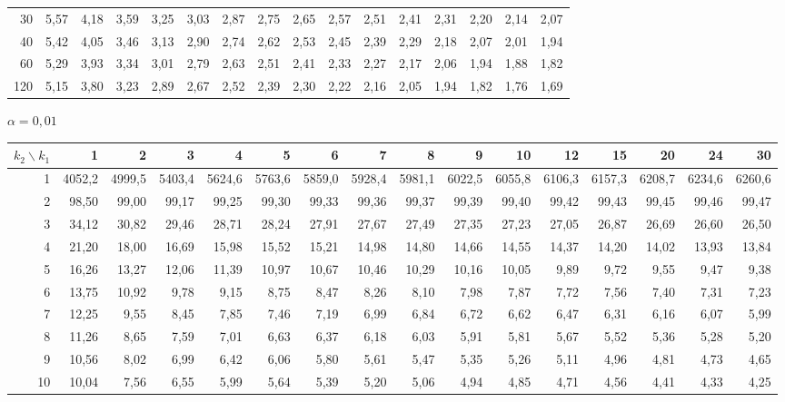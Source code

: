 \documentclass[a4paper,10pt]{extarticle}
\begin{document}
\begin{center}
\begin{tabular}{r|rrrrrrrrrrrrrrr}
30 & 5,57 & 4,18 & 3,59 & 3,25 & 3,03 & 2,87 & 2,75 & 2,65 & 2,57 & 2,51 & 2,41 & 2,31 & 2,20 & 2,14 & 2,07\\
40 & 5,42 & 4,05 & 3,46 & 3,13 & 2,90 & 2,74 & 2,62 & 2,53 & 2,45 & 2,39 & 2,29 & 2,18 & 2,07 & 2,01 & 1,94\\
60 & 5,29 & 3,93 & 3,34 & 3,01 & 2,79 & 2,63 & 2,51 & 2,41 & 2,33 & 2,27 & 2,17 & 2,06 & 1,94 & 1,88 & 1,82\\
120 & 5,15 & 3,80 & 3,23 & 2,89 & 2,67 & 2,52 & 2,39 & 2,30 & 2,22 & 2,16 & 2,05 & 1,94 & 1,82 & 1,76 & 1,69\\
\end{tabular}
\end{center}
\newpage
\scriptsize\renewcommand{\arraystretch}{0.86}\setlength{\tabcolsep}{2.6pt}
\begin{center}
\textbf{$\alpha=0{,}01$}\\[1pt]
\begin{tabular}{r|rrrrrrrrrrrrrrr}
$k_2\backslash k_1$ & 1 & 2 & 3 & 4 & 5 & 6 & 7 & 8 & 9 & 10 & 12 & 15 & 20 & 24 & 30\\\hline
1 & 4052,2 & 4999,5 & 5403,4 & 5624,6 & 5763,6 & 5859,0 & 5928,4 & 5981,1 & 6022,5 & 6055,8 & 6106,3 & 6157,3 & 6208,7 & 6234,6 & 6260,6\\
2 & 98,50 & 99,00 & 99,17 & 99,25 & 99,30 & 99,33 & 99,36 & 99,37 & 99,39 & 99,40 & 99,42 & 99,43 & 99,45 & 99,46 & 99,47\\
3 & 34,12 & 30,82 & 29,46 & 28,71 & 28,24 & 27,91 & 27,67 & 27,49 & 27,35 & 27,23 & 27,05 & 26,87 & 26,69 & 26,60 & 26,50\\
4 & 21,20 & 18,00 & 16,69 & 15,98 & 15,52 & 15,21 & 14,98 & 14,80 & 14,66 & 14,55 & 14,37 & 14,20 & 14,02 & 13,93 & 13,84\\
5 & 16,26 & 13,27 & 12,06 & 11,39 & 10,97 & 10,67 & 10,46 & 10,29 & 10,16 & 10,05 & 9,89 & 9,72 & 9,55 & 9,47 & 9,38\\
6 & 13,75 & 10,92 & 9,78 & 9,15 & 8,75 & 8,47 & 8,26 & 8,10 & 7,98 & 7,87 & 7,72 & 7,56 & 7,40 & 7,31 & 7,23\\
7 & 12,25 & 9,55 & 8,45 & 7,85 & 7,46 & 7,19 & 6,99 & 6,84 & 6,72 & 6,62 & 6,47 & 6,31 & 6,16 & 6,07 & 5,99\\
8 & 11,26 & 8,65 & 7,59 & 7,01 & 6,63 & 6,37 & 6,18 & 6,03 & 5,91 & 5,81 & 5,67 & 5,52 & 5,36 & 5,28 & 5,20\\
9 & 10,56 & 8,02 & 6,99 & 6,42 & 6,06 & 5,80 & 5,61 & 5,47 & 5,35 & 5,26 & 5,11 & 4,96 & 4,81 & 4,73 & 4,65\\
10 & 10,04 & 7,56 & 6,55 & 5,99 & 5,64 & 5,39 & 5,20 & 5,06 & 4,94 & 4,85 & 4,71 & 4,56 & 4,41 & 4,33 & 4,25\\

\end{tabular}
\end{center}
\end{document}
